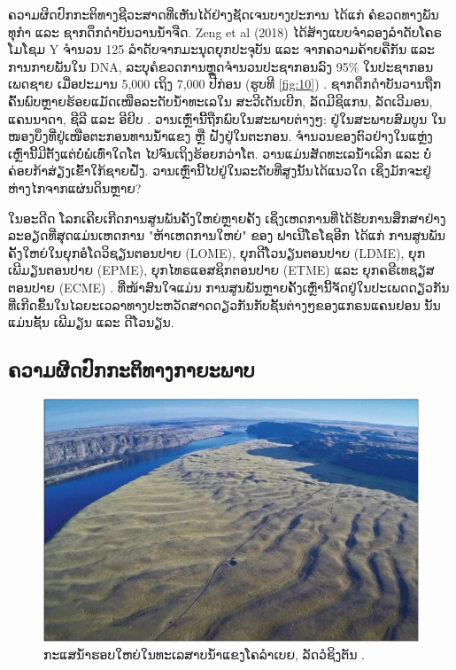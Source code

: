 \documentclass[10pt,twocolumn,letterpaper]{article}
\begin{document}
ຄວາມຜິດປົກກະຕິທາງຊີວະສາດທີ່ເຫັນໄດ້ຢ່າງຊັດເຈນບາງປະການ ໄດ້ແກ່ ຄໍຂວດທາງພັນທຸກຳ ແລະ ຊາກດຶກດຳບັນວານນ້ຳຈືດ. Zeng et al (2018) ໄດ້ສ້າງແບບຈຳລອງລຳດັບໂຄຣໂມໂຊມ Y ຈຳນວນ 125 ລຳດັບຈາກມະນຸດຍຸກປະຈຸບັນ ແລະ ຈາກຄວາມຄ້າຍຄືກັນ ແລະ ການກາຍພັນໃນ DNA, ລະບຸຄໍຂວດການຫຼຸດຈຳນວນປະຊາກອນລົງ 95\% ໃນປະຊາກອນເພດຊາຍ ເມື່ອປະມານ 5,000 ເຖິງ 7,000 ປີກ່ອນ (ຮູບທີ \ref{fig:10}) \cite{62}. ຊາກດຶກດຳບັນວານຖືກຄົ້ນພົບຫຼາຍຮ້ອຍແມັດເໜືອລະດັບນ້ຳທະເລໃນ ສະວີເດັນເບີກ, ລັດມີຊິແກນ, ລັດເວີມອນ, ແຄນນາດາ, ຊີລີ ແລະ ອີຢິບ \cite{63,64,65,66}. ວານເຫຼົ່ານີ້ຖືກພົບໃນສະພາບຕ່າງໆ: ຢູ່ໃນສະພາບສົມບູນ ໃນໜອງບຶງທີ່ຢູ່ເໜືອຕະກອນທານນ້ຳແຂງ ຫຼື ຝັງຢູ່ໃນຕະກອນ. ຈຳນວນຂອງຕົວຢ່າງໃນແຫຼ່ງເຫຼົ່ານີ້ມີຕັ້ງແຕ່ບໍ່ພໍເທົ່າໃດໂຕ ໄປຈົນເຖິງຮ້ອຍກວ່າໂຕ. ວານແມ່ນສັດທະເລນ້ຳເລິກ ແລະ ບໍ່ຄ່ອຍກ້າສ່ຽງເຂົ້າໃກ້ຊາຍຝັ່ງ. ວານເຫຼົ່ານີ້ໄປຢູ່ໃນລະດັບທີ່ສູງນັ້ນໄດ້ແນວໃດ ເຊິ່ງມັກຈະຢູ່ຫ່າງໄກຈາກແຜ່ນດິນຫຼາຍ?

ໃນອະດີດ ໂລກເຄີຍເກີດການສູນພັນຄັ້ງໃຫຍ່ຫຼາຍຄັ້ງ ເຊິ່ງເຫດການທີ່ໄດ້ຮັບການສຶກສາຢ່າງລະອຽດທີ່ສຸດແມ່ນເຫດການ "ຫ້າເຫດການໃຫຍ່"  ຂອງ ຟາເນີໂຣໂຊອີກ ໄດ້ແກ່ ການສູນພັນຄັ້ງໃຫຍ່ໃນຍຸກອໍໂດວິຊຽນຕອນປາຍ (LOME), ຍຸກດີໂວນຽນຕອນປາຍ (LDME), ຍຸກເພີມຽນຕອນປາຍ (EPME), ຍຸກໄທຣແອສຊິກຕອນປາຍ (ETME) ແລະ ຍຸກຄຣີເທຊຽສຕອນປາຍ (ECME) \cite{88,89}. ທີ່ໜ້າສົນໃຈແມ່ນ ການສູນພັນຫຼາຍຄັ້ງເຫຼົ່ານີ້ຈັດຢູ່ໃນປະເພດດຽວກັນທີ່ເກີດຂຶ້ນໃນໄລຍະເວລາທາງປະຫວັດສາດດຽວກັນກັບຊັ້ນຕ່າງໆຂອງແກຣນແຄນຢອນ ນັ້ນແມ່ນຊັ້ນ ເພີມຽນ ແລະ ດີໂວນຽນ.

\subsection{ຄວາມຜິດປົກກະຕິທາງກາຍະພາບ}

\begin{figure}[t]
\begin{center}
   \includegraphics[width=1\linewidth]{columbia.jpg}
\end{center}
   \caption{ກະແສນ້ຳຮອບໃຫຍ່ໃນທະເລສາບນ້ຳແຂງໂຄລຳເບຍ, ລັດວໍຊິງຕັນ \cite{80}.}
\label{fig:11}
\label{fig:onecol}
\end{figure}
\end{document}
